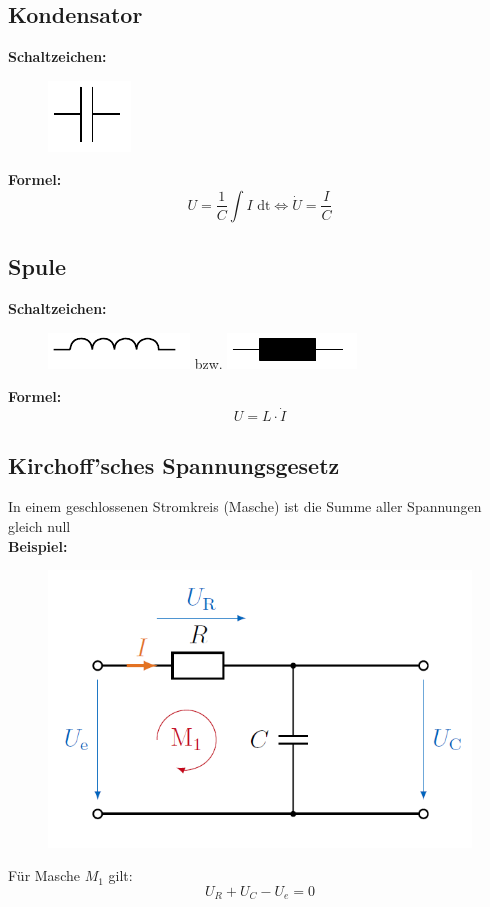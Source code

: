 \documentclass[10pt,a4paper]{article}
\begin{document}
\subsection{Kondensator}
\textbf{Schaltzeichen:} \\
\begin{figure}[H]
	\includegraphics[width=0.1\columnwidth]{imgs/kondensator.pdf}
\end{figure}
\textbf{Formel:}
$$
	U = \frac 1 C \int I \textrm{ dt} \iff \dot U = \frac I C
$$

\subsection{Spule}
\textbf{Schaltzeichen:} \\
\begin{figure}[H]
	\includegraphics[width=0.1\columnwidth]{imgs/spule.pdf} bzw. 
	\includegraphics[width=0.1\columnwidth]{imgs/spule_alt.pdf}	
\end{figure}
\textbf{Formel:}
$$
	U = L ⋅ \dot I
$$

\subsection{Kirchoff'sches Spannungsgesetz}
In einem geschlossenen Stromkreis (Masche) ist die Summe aller Spannungen gleich null \\

\textbf{Beispiel:}
\begin{figure}[H]
	\includegraphics[width=0.5\columnwidth]{imgs/kvl.png}
\end{figure}
Für Masche $M_1$ gilt:
$$
U_R + U_C - U_e = 0
$$
\end{document}
